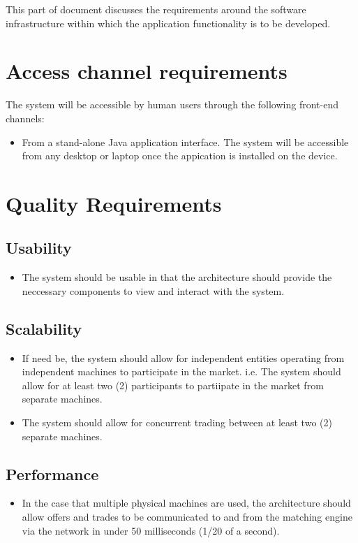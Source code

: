 \documentclass[12pt]{article}
\begin{document}
				  
		\newpage
		This part of document discusses the requirements around the software infrastructure within which the application functionality is to be developed. 
		\section{Access channel requirements}
		The system will be accessible by human users through the following front-end channels:
		\begin{itemize}
		\item From a stand-alone Java application interface. The system will be accessible from any desktop or laptop once the appication is installed on the device.
		\end{itemize}
		
		\section{Quality Requirements}
			\subsection{Usability}
			\begin{itemize}
			\item The system should be usable in that the architecture should provide the neccessary components to view and interact with the system.
			\end{itemize}
			\subsection{Scalability}
			\begin{itemize}
			\item If need be, the system should allow for independent entities operating from independent machines to participate in the market. i.e. The system should allow for at least two (2) participants to partiipate in the market from separate machines.
			\item The system should allow for concurrent trading between at least two (2) separate machines.
			\end{itemize}
			\subsection{Performance}
			\begin{itemize}
			\item In the case that multiple physical machines are used, the architecture should allow offers and trades to be communicated to and from the matching engine via the network in under 50 milliseconds (1/20 of a second). 
			\end{itemize}
\end{document}
